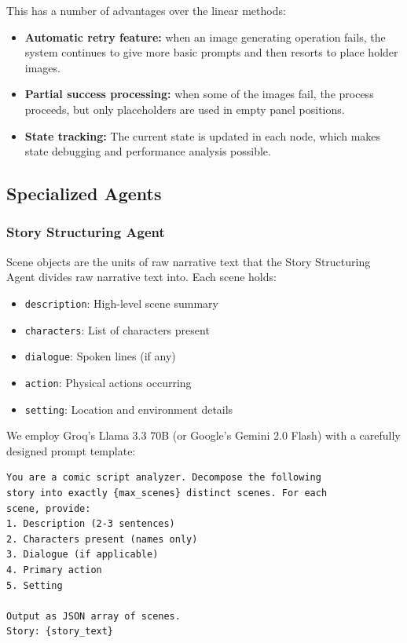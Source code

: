 \documentclass[runningheads]{llncs}
\begin{document}
This has a number of advantages over the linear methods:
\begin{itemize}
\item \textbf{Automatic retry feature:} when an image generating operation fails, the system continues to give more basic prompts and then resorts to place holder images.
\item \textbf{Partial success processing:} when some of the images fail, the process proceeds, but only placeholders are used in empty panel positions.
\item \textbf{State tracking:} The current state is updated in each node, which makes state debugging and performance analysis possible.
\end{itemize}

\subsection{Specialized Agents}

\subsubsection{Story Structuring Agent}

Scene objects are the units of raw narrative text that the Story Structuring Agent divides raw narrative text into. Each scene holds:
\begin{itemize}
\item \texttt{description}: High-level scene summary
\item \texttt{characters}: List of characters present
\item \texttt{dialogue}: Spoken lines (if any)
\item \texttt{action}: Physical actions occurring
\item \texttt{setting}: Location and environment details
\end{itemize}

We employ Groq's Llama 3.3 70B (or Google's Gemini 2.0 Flash) with a carefully designed prompt template:

\begin{small}
\begin{verbatim}
You are a comic script analyzer. Decompose the following
story into exactly {max_scenes} distinct scenes. For each
scene, provide:
1. Description (2-3 sentences)
2. Characters present (names only)
3. Dialogue (if applicable)
4. Primary action
5. Setting

Output as JSON array of scenes.
Story: {story_text}
\end{verbatim}
\end{small}
\end{document}
